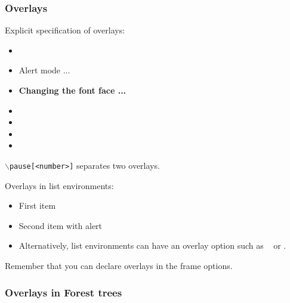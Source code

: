 \begin{frame}
  \frametitle{Overlays}
  {\small 

    Explicit specification of overlays:
    \begin{itemize}
    \item {}
    \item \alert<3>{Alert mode ...} 
    \item \textbf<4>{Changing the font face ...}
    \item {} 
    \item {}
    \item {}
    \item {}
    \end{itemize}

    \vfill
    {\tt $\backslash$pause[<number>]} separates two overlays.

    \vfill
    Overlays in list environments:
    \begin{itemize}
    \item<9-> First item
    \item<alert@10> Second item with alert
    \item Alternatively, list environments can have an overlay option such as {\tt <+-> } or {\tt <+- alert@ +>}.
    \end{itemize}

    \vfill
    Remember that you can declare overlays in the frame options.
    \hyperlink{frameoptions}{}

  }
\end{frame}


\begin{frame}
\frametitle{Overlays in Forest trees}


\end{frame}
